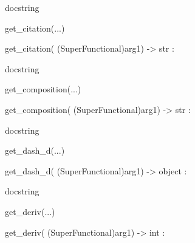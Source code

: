 \documentclass[letterpaper,10pt,english]{sphinxmanual}
\begin{document}
\begin{description}
\begin{description}
\begin{DUlineblock}{0em}
\begin{DUlineblock}{\DUlineblockindent}
\begin{DUlineblock}{\DUlineblockindent}
\item[] docstring
\item[] 
\end{DUlineblock}
\end{DUlineblock}
\item[] get\_citation(...)
\item[]
\begin{DUlineblock}{\DUlineblockindent}
\item[] get\_citation( (SuperFunctional)arg1) -\textgreater{} str :
\item[]
\begin{DUlineblock}{\DUlineblockindent}
\item[] docstring
\item[] 
\end{DUlineblock}
\end{DUlineblock}
\item[] get\_composition(...)
\item[]
\begin{DUlineblock}{\DUlineblockindent}
\item[] get\_composition( (SuperFunctional)arg1) -\textgreater{} str :
\item[]
\begin{DUlineblock}{\DUlineblockindent}
\item[] docstring
\item[] 
\end{DUlineblock}
\end{DUlineblock}
\item[] get\_dash\_d(...)
\item[]
\begin{DUlineblock}{\DUlineblockindent}
\item[] get\_dash\_d( (SuperFunctional)arg1) -\textgreater{} object :
\item[]
\begin{DUlineblock}{\DUlineblockindent}
\item[] docstring
\item[] 
\end{DUlineblock}
\end{DUlineblock}
\item[] get\_deriv(...)
\item[]
\begin{DUlineblock}{\DUlineblockindent}
\item[] get\_deriv( (SuperFunctional)arg1) -\textgreater{} int :
\item[]
\begin{DUlineblock}{\DUlineblockindent}

\end{DUlineblock}
\end{DUlineblock}
\end{DUlineblock}
\end{description}
\end{description}
\end{document}
